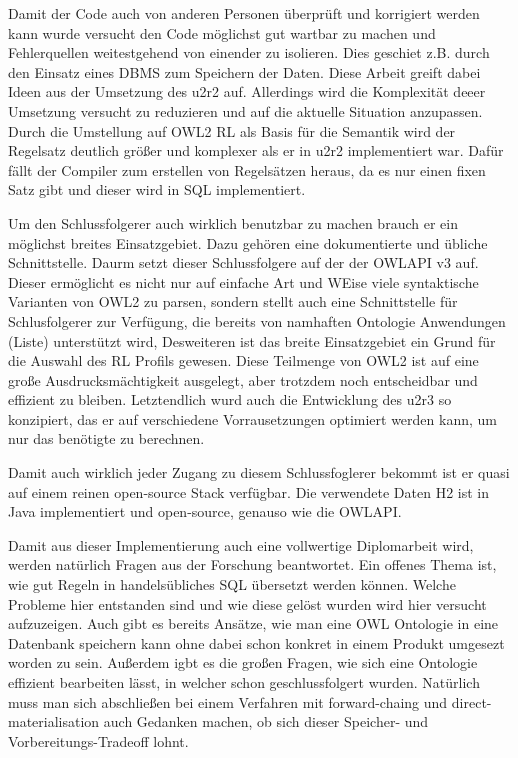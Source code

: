 Damit der Code auch von anderen Personen überprüft und korrigiert werden kann wurde versucht den Code möglichst gut wartbar zu machen und Fehlerquellen weitestgehend von einender zu isolieren. Dies geschiet z.B. durch den Einsatz eines DBMS zum Speichern der Daten. Diese Arbeit greift dabei Ideen aus der Umsetzung des u2r2 \cite{Weithoehner2008} auf.
Allerdings wird die Komplexität deeer Umsetzung versucht zu reduzieren und auf die aktuelle Situation anzupassen. Durch die Umstellung auf OWL2 RL als Basis für die Semantik wird der Regelsatz deutlich größer und komplexer als er in u2r2 implementiert war. Dafür fällt der Compiler zum erstellen von Regelsätzen heraus, da es nur einen fixen Satz gibt und dieser wird in SQL implementiert.


Um den Schlussfolgerer auch wirklich benutzbar zu machen brauch er ein möglichst breites Einsatzgebiet. Dazu gehören eine dokumentierte und übliche Schnittstelle. Daurm setzt dieser Schlussfolgere auf der der OWLAPI v3 \cite{OWLAPI} auf. Dieser ermöglicht es nicht nur auf einfache Art und WEise viele syntaktische Varianten von OWL2 zu parsen, sondern stellt auch eine Schnittstelle für Schlusfolgerer zur Verfügung, die bereits von namhaften Ontologie Anwendungen (Liste) unterstützt wird, Desweiteren ist das breite Einsatzgebiet ein Grund für die Auswahl des RL Profils gewesen. Diese Teilmenge von OWL2 ist auf eine große Ausdrucksmächtigkeit ausgelegt, aber trotzdem noch entscheidbar und effizient zu bleiben. Letztendlich wurd auch die Entwicklung des u2r3 so konzipiert, das er auf verschiedene Vorrausetzungen optimiert werden kann, um nur das benötigte zu berechnen.

Damit auch wirklich jeder Zugang zu diesem Schlussfoglerer bekommt ist er quasi auf einem reinen open-source Stack verfügbar. Die verwendete Daten H2 ist in Java implementiert und open-source, genauso wie die OWLAPI.

Damit aus dieser Implementierung auch eine vollwertige Diplomarbeit wird, werden natürlich Fragen aus der Forschung beantwortet. Ein offenes Thema ist, wie gut Regeln in handelsübliches SQL übersetzt werden können. Welche Probleme hier entstanden sind und wie diese gelöst wurden wird hier versucht aufzuzeigen. Auch gibt es bereits Ansätze, wie man eine OWL Ontologie in eine Datenbank speichern kann \cite{Kleb2009OWLDB} ohne dabei schon konkret in einem Produkt umgesezt worden zu sein. Außerdem igbt es die großen Fragen, wie sich eine Ontologie effizient bearbeiten lässt, in welcher schon geschlussfolgert wurden. Natürlich muss man sich abschließen bei einem Verfahren mit forward-chaing und direct-materialisation auch Gedanken machen, ob sich dieser Speicher- und Vorbereitungs-Tradeoff lohnt.


